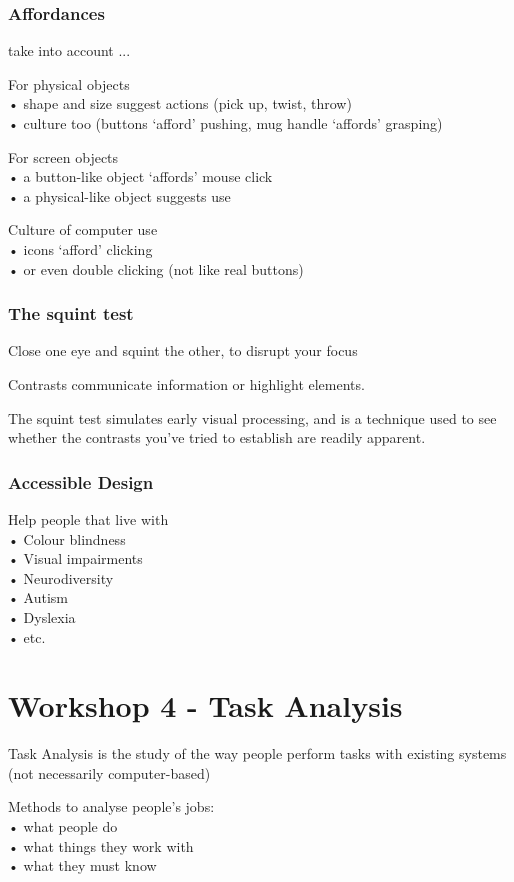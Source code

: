 \documentclass[]{project_plan}
\begin{document}
\subsection{Affordances}
take into account ...

For physical objects\\
• shape and size suggest actions (pick up, twist, throw)\\
• culture too (buttons ‘afford’ pushing, mug handle ‘affords’ grasping)

For screen objects\\
• a button-like object ‘affords’ mouse click\\
• a physical-like object suggests use

Culture of computer use\\
• icons ‘afford’ clicking\\
• or even double clicking (not like real buttons)

\subsection{The squint test}
Close one eye and squint the other, to disrupt your focus

Contrasts communicate information or highlight elements.

The squint test simulates early visual processing, and is a
technique used to see whether the contrasts you’ve tried
to establish are readily apparent.

\subsection{Accessible Design}
Help people that live with\\
• Colour blindness\\
• Visual impairments\\
• Neurodiversity\\
• Autism\\
• Dyslexia\\
• etc.

\chapter{Workshop 4 - Task Analysis}

Task Analysis is the study of the way people perform tasks
with existing systems (not necessarily
computer-based)

Methods to analyse people's jobs:\\
• what people do\\
• what things they work with\\
• what they must know
\end{document}
